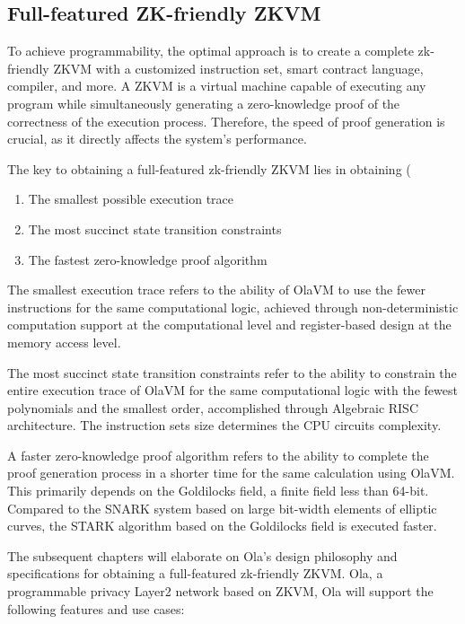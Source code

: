 \subsection{Full-featured ZK-friendly ZKVM}

To achieve programmability, the optimal approach is to create a complete zk-friendly ZKVM with a customized instruction set, smart contract language, compiler, and more. A ZKVM is a virtual machine capable of executing any program while simultaneously generating a zero-knowledge proof of the correctness of the execution process. Therefore, the speed of proof generation is crucial, as it directly affects the system's performance.

The key to obtaining a full-featured zk-friendly ZKVM lies in obtaining (
\begin{enumerate}
    \item The smallest possible execution trace
    \item The most succinct state transition constraints
    \item The fastest zero-knowledge proof algorithm
\end{enumerate}

The smallest execution trace refers to the ability of OlaVM \cite{website:OlaVM} to use the fewer instructions for the same computational logic, achieved through non-deterministic computation support at the computational level and register-based design at the memory access level. 

The most succinct state transition constraints refer to the ability to constrain the entire execution trace of OlaVM for the same computational logic with the fewest polynomials and the smallest order, accomplished through Algebraic RISC architecture. The instruction sets size determines the CPU circuits complexity. 

A faster zero-knowledge proof algorithm refers to the ability to complete the proof generation process in a shorter time for the same calculation using OlaVM. This primarily depends on the Goldilocks \cite{website:Goldilocks} field, a finite field less than 64-bit. Compared to the SNARK system based on large bit-width elements of elliptic curves, the STARK algorithm based on the Goldilocks \cite{website:Goldilocks} field is executed faster.

The subsequent chapters will elaborate on Ola's design philosophy and specifications for obtaining a full-featured zk-friendly ZKVM. Ola, a programmable privacy Layer2 network based on ZKVM, Ola will support the following features and use cases: 

